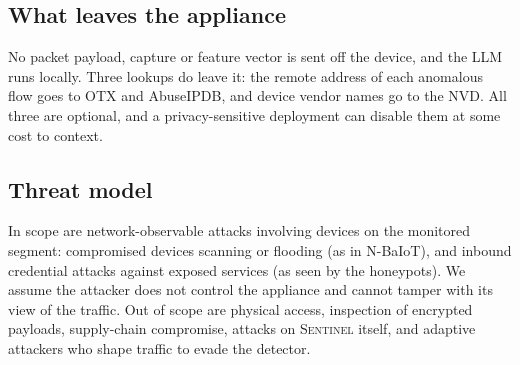 \subsection{What leaves the appliance}
No packet payload, capture or feature vector is sent off the device, and the
LLM runs locally. Three lookups do leave it: the remote address of each
anomalous flow goes to OTX and AbuseIPDB, and device vendor names go to the
NVD. All three are optional, and a privacy-sensitive deployment can disable
them at some cost to context.

\subsection{Threat model}
In scope are network-observable attacks involving devices on the monitored
segment: compromised devices scanning or flooding (as in N-BaIoT), and inbound
credential attacks against exposed services (as seen by the honeypots). We
assume the attacker does not control the appliance and cannot tamper with its
view of the traffic. Out of scope are physical access, inspection of encrypted
payloads, supply-chain compromise, attacks on \textsc{Sentinel} itself, and
adaptive attackers who shape traffic to evade the detector.
